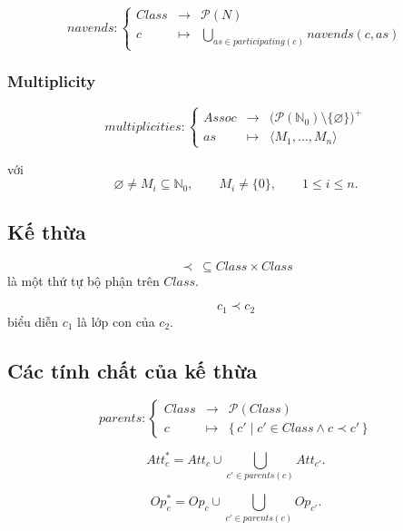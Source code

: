 \documentclass[12pt,a4paper]{article}
\theoremstyle{definition}
\begin{document}
\[
navends:
\left\{
\begin{array}{rcl}
Class & \to & \mathcal{P}(N)\\
c & \mapsto &
\displaystyle\bigcup_{as\in participating(c)}navends(c,as)
\end{array}
\right.
\]


\subsubsection{Multiplicity}

\[
multiplicities:
\left\{
\begin{array}{rcl}
Assoc
& \to &
\bigl(\mathcal{P}(\mathbb{N}_0)\setminus\{\varnothing\}\bigr)^{+}
\\
as
& \mapsto &
\langle M_1,\ldots,M_n\rangle
\end{array}
\right.
\]

với
\[
\varnothing\neq M_i\subseteq\mathbb{N}_0,
\qquad
M_i\neq\{0\},
\qquad
1\leq i\leq n.
\]


\subsection{Kế thừa}

\[
\prec\ \subseteq Class\times Class
\]
là một thứ tự bộ phận trên $Class$.

\[
c_1\prec c_2
\]
biểu diễn $c_1$ là lớp con của $c_2$.


\subsection{Các tính chất của kế thừa}

\[
parents:
\left\{
\begin{array}{rcl}
Class & \to & \mathcal{P}(Class)\\
c & \mapsto &
\{\,c'\mid c'\in Class\land c\prec c'\,\}
\end{array}
\right.
\]

\[
Att_c^{*}
=
Att_c
\cup
\bigcup_{c'\in parents(c)}Att_{c'}.
\]

\[
Op_c^{*}
=
Op_c
\cup
\bigcup_{c'\in parents(c)}Op_{c'}.
\]
\end{document}
